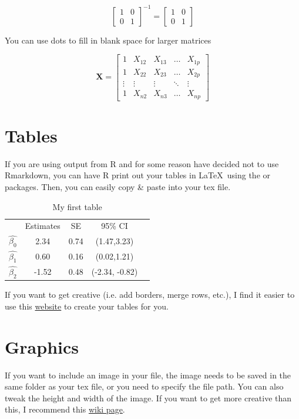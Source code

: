 \documentclass[11pt, oneside]{article}
\begin{document}
\[
\begin{bmatrix}
1 & 0 \\ 
0 & 1 
\end{bmatrix}^{-1} 
=
\begin{bmatrix}
1 & 0 \\ 
0 & 1 
\end{bmatrix}
\]

\noindent You can use dots to fill in blank space for larger matrices

\[
\mathbf{X} 
=
\begin{bmatrix}
1& X_{12} & X_{13} & \dots  & X_{1p} \\
1 & X_{22} & X_{23} & \dots  & X_{2p} \\
\vdots & \vdots & \vdots & \ddots & \vdots \\
1& X_{n2} & X_{n3} & \dots  & X_{np}
\end{bmatrix}
\]

\section{Tables} 
If you are using output from R and for some reason have decided not to use Rmarkdown, you can have R print out your tables in \LaTeX \ using the  \normalfont or  \normalfont packages. Then, you can easily copy \& paste into your tex file. \\

\begin{table}[!htb] 
	\caption{My first table} 
	\centering
	\begin{tabular}{lcccc} 
	 	&  Estimates & SE & 95\% CI &  \\
	$\widehat{\beta_0}$	& 2.34 & 0.74 & (1.47,3.23)  &  \\
	$\widehat{\beta_1}$ & 0.60 & 0.16 & (0.02,1.21)   &  \\
	$\widehat{\beta_2}$	& -1.52 & 0.48 & (-2.34, -0.82) & 
	\end{tabular}
\end{table}

\noindent If you want to get creative (i.e. add borders, merge rows, etc.), I find it easier to use this \href{http://www.tablesgenerator.com/}{website} to create your tables for you.

\newpage %

\section{Graphics}
If you want to include an image in your file, the image needs to be saved in the same folder as your tex file, or you need to specify the file path. You can also tweak the height and width of the image. If you want to get more creative than this, I recommend this \href{https://en.wikibooks.org/wiki/LaTeX/Floats,_Figures_and_Captions#Figures_in_multiple_parts}{wiki page}. 
\end{document}
